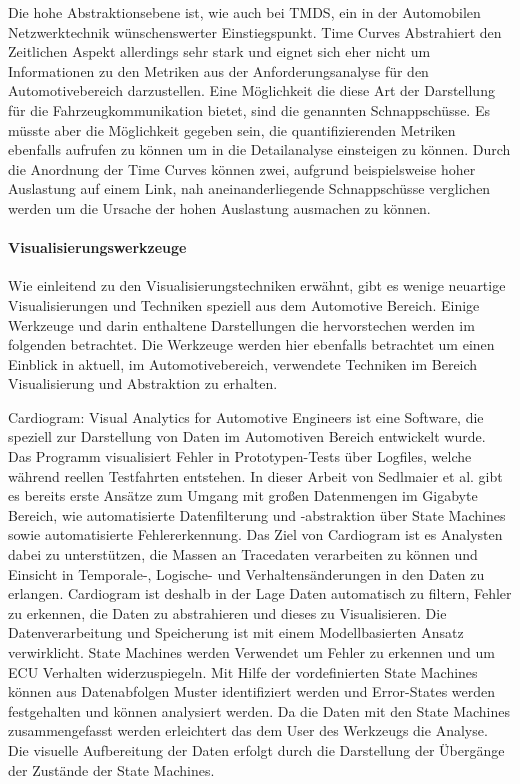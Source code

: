 \documentclass[draft=false
              ,paper=a4
              ,twoside=false
              ,fontsize=11pt
              ,headsepline
              ,BCOR10mm
              ,DIV11
              ]{scrbook}
\begin{document}
Die hohe Abstraktionsebene ist, wie auch bei TMDS, ein in der Automobilen Netzwerktechnik wünschenswerter Einstiegspunkt. Time Curves Abstrahiert den Zeitlichen Aspekt allerdings sehr stark und eignet sich eher nicht um Informationen zu den Metriken aus der Anforderungsanalyse für den Automotivebereich darzustellen. Eine Möglichkeit die diese Art der Darstellung für die Fahrzeugkommunikation bietet, sind die genannten Schnappschüsse. Es müsste aber die Möglichkeit gegeben sein, die quantifizierenden Metriken ebenfalls aufrufen zu können um in die Detailanalyse einsteigen zu können. Durch die Anordnung der Time Curves können zwei, aufgrund beispielsweise hoher Auslastung auf einem Link, nah aneinanderliegende Schnappschüsse verglichen werden um die Ursache der hohen Auslastung ausmachen zu können.  

\paragraph{Visualisierungswerkzeuge} %
\label{par:visualisierungswerkzeuge}
Wie einleitend zu den Visualisierungstechniken erwähnt, gibt es wenige neuartige Visualisierungen und Techniken speziell aus dem Automotive Bereich. Einige Werkzeuge und darin enthaltene Darstellungen die hervorstechen werden im folgenden betrachtet. Die Werkzeuge werden hier ebenfalls betrachtet um einen Einblick in aktuell, im Automotivebereich, verwendete Techniken im Bereich Visualisierung und Abstraktion zu erhalten. 

Cardiogram: Visual Analytics for Automotive Engineers \cite{sedlmair_cardiogram:_2011} ist eine Software, die speziell zur Darstellung von Daten im Automotiven Bereich entwickelt wurde. Das Programm visualisiert Fehler in Prototypen-Tests über Logfiles, welche während reellen Testfahrten entstehen. In dieser Arbeit von Sedlmaier et al. gibt es bereits erste Ansätze zum Umgang mit großen Datenmengen im Gigabyte Bereich, wie automatisierte Datenfilterung und -abstraktion über State Machines sowie automatisierte Fehlererkennung. Das Ziel von Cardiogram ist es Analysten dabei zu unterstützen, die Massen an Tracedaten verarbeiten zu können und Einsicht in Temporale-, Logische- und Verhaltensänderungen in den Daten zu erlangen. Cardiogram ist deshalb in der Lage Daten automatisch zu filtern, Fehler zu erkennen, die Daten zu abstrahieren und dieses zu Visualisieren. Die Datenverarbeitung und Speicherung ist mit einem Modellbasierten Ansatz verwirklicht. State Machines werden Verwendet um Fehler zu erkennen und um ECU Verhalten widerzuspiegeln. Mit Hilfe der vordefinierten State Machines können aus Datenabfolgen Muster identifiziert werden und Error-States werden festgehalten und können analysiert werden. Da die Daten mit den State Machines zusammengefasst werden erleichtert das dem User des Werkzeugs die Analyse. Die visuelle Aufbereitung der Daten erfolgt durch die Darstellung der Übergänge der Zustände der State Machines. 
\end{document}
